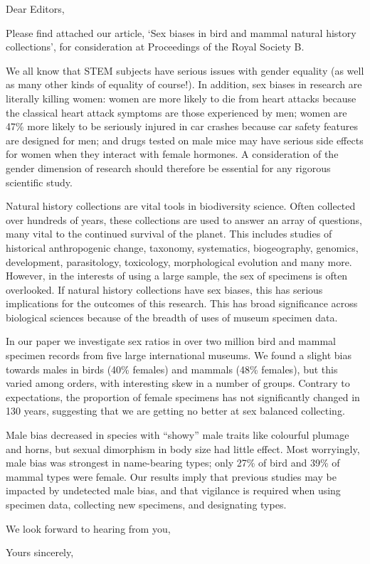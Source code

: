 \documentclass[11pt]{letter}
\begin{document}
\begin{letter}{}
\opening{Dear Editors,}

Please find attached our article, `Sex biases in bird and mammal natural history collections', for consideration at Proceedings of the Royal Society B.

We all know that STEM subjects have serious issues with gender equality (as well as many other kinds of equality of course!). In addition, sex biases in research are literally killing women: women are more likely to die from heart attacks because the classical heart attack symptoms are those experienced by men; women are 47\% more likely to be seriously injured in car crashes because car safety features are designed for men; and drugs tested on male mice may have serious side effects for women when they interact with female hormones. A consideration of the gender dimension of research should therefore be essential for any rigorous scientific study.

Natural history collections are vital tools in biodiversity science. Often collected over hundreds of years, these collections are used to answer an array of questions, many vital to the continued survival of the planet. This includes studies of historical anthropogenic change, taxonomy, systematics, biogeography, genomics, development, parasitology, toxicology, morphological evolution and many more. However, in the interests of using a large sample, the sex of specimens is often overlooked. If natural history collections have sex biases, this has serious implications for the outcomes of this research. This has broad significance across biological sciences because of the breadth of uses of museum specimen data. 

In our paper we investigate sex ratios in over two million bird and mammal specimen records from five large international museums. We found a slight bias towards males in birds (40\% females) and mammals (48\% females), but this varied among orders, with interesting skew in a number of groups. Contrary to expectations, the proportion of female specimens has not significantly changed in 130 years, suggesting that we are getting no better at sex balanced collecting.

Male bias decreased in species with ``showy'' male traits like colourful plumage and horns, but  sexual dimorphism in body size had little effect. Most worryingly, male bias was strongest in name-bearing types; only 27\% of bird and 39\% of mammal types were female. Our results imply that previous studies may be impacted by undetected male bias, and that vigilance is required when using specimen data, collecting new specimens, and designating types. 
 
We look forward to hearing from you,


\closing{Yours sincerely,}


\end{letter}
\end{document}

